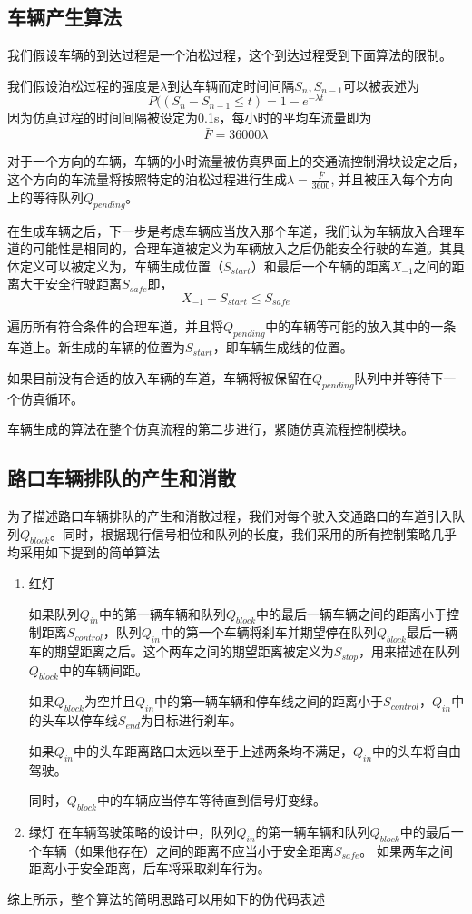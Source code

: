 \documentclass[a4paper,UTF8]{paper}
\begin{document}
\subsection{车辆产生算法}
我们假设车辆的到达过程是一个泊松过程，这个到达过程受到下面算法的限制。

我们假设泊松过程的强度是$\lambda$到达车辆而定时间间隔$S_n,S_{n-1}$可以被表述为 
$$P((S_n-S_{n-1}\le t) = 1 - e^{-\lambda t}$$
因为仿真过程的时间间隔被设定为0.1s，每小时的平均车流量即为$$\bar{F}=36000\lambda$$

对于一个方向的车辆，车辆的小时流量被仿真界面上的交通流控制滑块设定之后，这个方向的车流量将按照特定的泊松过程进行生成$\lambda=\displaystyle{\frac{\bar{F}}{3600}}$, 并且被压入每个方向上的等待队列$Q_{pending}$。

在生成车辆之后，下一步是考虑车辆应当放入那个车道，我们认为车辆放入合理车道的可能性是相同的，合理车道被定义为车辆放入之后仍能安全行驶的车道。其具体定义可以被定义为，车辆生成位置（$S_{start}$）和最后一个车辆的距离$X_{-1}$之间的距离大于安全行驶距离$S_{safe}$即，$$X_{-1}-S_{start}\le S_{safe}$$

遍历所有符合条件的合理车道，并且将$Q_{pending}$中的车辆等可能的放入其中的一条车道上。新生成的车辆的位置为$S_{start}$，即车辆生成线的位置。

如果目前没有合适的放入车辆的车道，车辆将被保留在$Q_{pending}$队列中并等待下一个仿真循环。

车辆生成的算法在整个仿真流程的第二步进行，紧随仿真流程控制模块。
\subsection{路口车辆排队的产生和消散}
\label{section:feq}
为了描述路口车辆排队的产生和消散过程，我们对每个驶入交通路口的车道引入队列$Q_{block}$。同时，根据现行信号相位和队列的长度，我们采用的所有控制策略几乎均采用如下提到的简单算法
\begin{enumerate}
\item 红灯

如果队列$Q_{in}$中的第一辆车辆和队列$Q_{block}$中的最后一辆车辆之间的距离小于控制距离$S_{control}$，队列$Q_{in}$中的第一个车辆将刹车并期望停在队列$Q_{block}$最后一辆车的期望距离之后。这个两车之间的期望距离被定义为$S_{stop}$，用来描述在队列$Q_{block}$中的车辆间距。 

如果$Q_{block}$为空并且$Q_{in}$中的第一辆车辆和停车线之间的距离小于$S_{control}$，$Q_{in}$中的头车以停车线$S_{end}$为目标进行刹车。

如果$Q_{in}$中的头车距离路口太远以至于上述两条均不满足，$Q_{in}$中的头车将自由驾驶。

同时，$Q_{block}$中的车辆应当停车等待直到信号灯变绿。
\item 绿灯
在车辆驾驶策略的设计中，队列$Q_{in}$的第一辆车辆和队列$Q_{block}$中的最后一个车辆（如果他存在）之间的距离不应当小于安全距离$S_{safe}$。 如果两车之间距离小于安全距离，后车将采取刹车行为。
\end{enumerate}
综上所示，整个算法的简明思路可以用如下的伪代码表述\\ 
\end{document}
